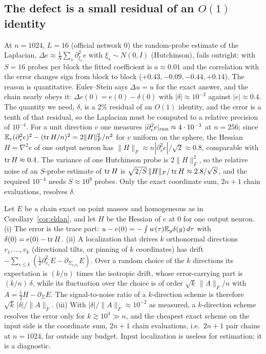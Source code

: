 \subsection{The defect is a small residual of an $O(1)$ identity}
At $n=1024$, $L=16$ (official network $0$) the random-probe estimate of the Laplacian,
$\Delta e\approx\frac1S\sum_s\partial_{\xi_s}^2e$ with $\xi_s\sim N(0,I)$ (Hutchinson), fails outright: with
$S=16$ probes per block the fitted coefficient is $a\approx0.01$ and the correlation with the error changes sign
from block to block ($+0.43,-0.09,-0.44,+0.14$). The reason is quantitative. Euler--Stein says $\Delta u=u$ for
the exact answer, and the chain nearly obeys it: $\Delta e(0)=e(0)-\delta(0)$ with $|\delta|\approx10^{-2}$ against
$|e|\approx0.4$. The quantity we need, $\delta$, is a $2\%$ residual of an $O(1)$ identity, and the error is a
tenth of that residual, so the Laplacian must be computed to a relative precision of $10^{-4}$. For a unit
direction $v$ one measures $|\partial_v^2e|_{\rm rms}\approx4\cdot10^{-3}$ at $n=256$; since
$\mathbb E_v(\partial_v^2e)^2-(\operatorname{tr} H/n)^2=2\|H\|_F^2/n^2$ for $v$ uniform on the sphere, the Hessian $H=\nabla^2e$ of one
output neuron has $\|H\|_F\approx n|\partial_v^2e|/\sqrt2\approx0.8$, comparable with $\operatorname{tr} H\approx0.4$. The
variance of one Hutchinson probe is $2\|H\|_F^2$, so the relative noise of an $S$-probe estimate of $\operatorname{tr} H$ is
$\sqrt{2/S}\,\|H\|_F/\operatorname{tr} H\approx2.8/\sqrt S$, and the required $10^{-4}$ needs $S\approx10^9$ probes. Only the
exact coordinate sum, $2n+1$ chain evaluations, resolves $\delta$.

\begin{proposition}\label{prop:capacity}
Let $E$ be a chain exact on point masses and homogeneous as in Corollary~\ref{cor:eldan}, and let $H$ be the
Hessian of $e$ at $0$ for one output neuron. (i) The error is the trace part: $u-e(0)=-\int w(\tau)\mathbb E_y\delta(y)\,d\tau$
with $\delta(0)=e(0)-\operatorname{tr} H$. (ii) A localization that drives $k$ orthonormal directions $v_1,\dots,v_k$ (directional
tilts, or pinning of $k$ coordinates) has drift $-\sum_{s\le k}(\tfrac12\partial_{v_s}^2E-\partial_{\Sigma_{v_sv_s}}E)$.
Over a random choice of the $k$ directions its expectation is $(k/n)$ times the isotropic drift, whose
error-carrying part is $(k/n)\,\delta$, while its fluctuation over the choice is of order $\sqrt{k}\,\|A\|_F/n$
with $A=\tfrac12H-\partial_\Sigma E$. The signal-to-noise ratio of a $k$-direction scheme is therefore
$\sqrt k\,|\delta|/\|A\|_F$.
(iii) With $|\delta|/\|A\|_F\approx10^{-2}$ as measured, a $k$-direction scheme resolves the error only for
$k\gtrsim10^4\gg n$, and the cheapest exact scheme on the input side is the coordinate sum, $2n+1$ chain
evaluations, i.e.\ $2n+1$ pair chains at $n=1024$, far outside any budget. Input localization is useless for
estimation; it is a diagnostic.
\end{proposition}

